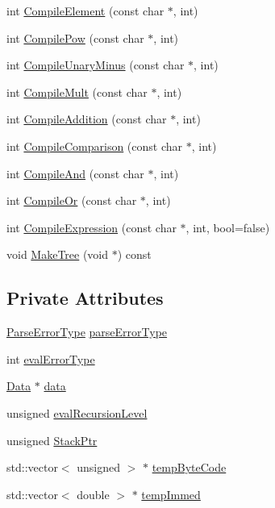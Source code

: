 \begin{DoxyCompactItemize}
\item 
int \hyperlink{class_function_parser_a7673096cf704d1fa7ab542db5f22fe95}{Compile\+Element} (const char $\ast$, int)
\item 
int \hyperlink{class_function_parser_a34d2686ecb9619b0b459bfa249b64498}{Compile\+Pow} (const char $\ast$, int)
\item 
int \hyperlink{class_function_parser_adda1df6bf29a91d38e838bdf96524f61}{Compile\+Unary\+Minus} (const char $\ast$, int)
\item 
int \hyperlink{class_function_parser_ade4859b2f9b822a19a2beccbc25d36b0}{Compile\+Mult} (const char $\ast$, int)
\item 
int \hyperlink{class_function_parser_a9b3024d49f9094731f3cbd17eeea29e5}{Compile\+Addition} (const char $\ast$, int)
\item 
int \hyperlink{class_function_parser_a2418f51d1feca9195780bda66a64923a}{Compile\+Comparison} (const char $\ast$, int)
\item 
int \hyperlink{class_function_parser_adb0768f374333bbee4c84c30a2769d1b}{Compile\+And} (const char $\ast$, int)
\item 
int \hyperlink{class_function_parser_a233a126157058829dcda9aa3f00781f8}{Compile\+Or} (const char $\ast$, int)
\item 
int \hyperlink{class_function_parser_a854c0c23a60d2d206ddf67015747a80a}{Compile\+Expression} (const char $\ast$, int, bool=false)
\item 
void \hyperlink{class_function_parser_a8f09d400c39a72c7485d26cbff2543c9}{Make\+Tree} (void $\ast$) const
\end{DoxyCompactItemize}
\subsection*{Private Attributes}
\begin{DoxyCompactItemize}
\item 
\hyperlink{class_function_parser_a0bb74d288d02ba86367cc1c85351c8e7}{Parse\+Error\+Type} \hyperlink{class_function_parser_a8ae06b8ee6ddb247b6a7c0075fd6cf30}{parse\+Error\+Type}
\item 
int \hyperlink{class_function_parser_a43c35628fcb4a11d459e48265eca45df}{eval\+Error\+Type}
\item 
\hyperlink{struct_function_parser_1_1_data}{Data} $\ast$ \hyperlink{class_function_parser_ac4c90e783d1a41f8f842383a9a5088d0}{data}
\item 
unsigned \hyperlink{class_function_parser_a5b75f74ce82219fc4aaf05665ab46034}{eval\+Recursion\+Level}
\item 
unsigned \hyperlink{class_function_parser_a4a54f868e24abc53d4474ca538c999bf}{Stack\+Ptr}
\item 
std\+::vector$<$ unsigned $>$ $\ast$ \hyperlink{class_function_parser_a78e461023408c6074247df656f93bbae}{temp\+Byte\+Code}
\item 
std\+::vector$<$ double $>$ $\ast$ \hyperlink{class_function_parser_a9e6c21543859ee17e917a292a16c495a}{temp\+Immed}
\end{DoxyCompactItemize}


